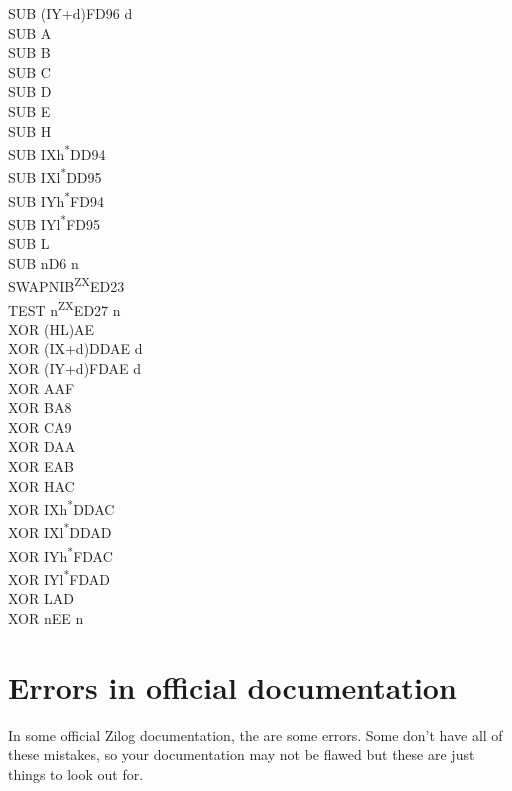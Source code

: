 \documentclass[twoside,openright,a4paper]{book}
\begin{document}
\begin{multicols}{3}
{\begin{tabbing}
	SUB (IY+d)\>FD96 d\\
	SUB A\\
	SUB B\\
	SUB C\\
	SUB D\\
	SUB E\\
	SUB H\\
	SUB IXh\textsuperscript{*}\>DD94\\
	SUB IXl\textsuperscript{*}\>DD95\\
	SUB IYh\textsuperscript{*}\>FD94\\
	SUB IYl\textsuperscript{*}\>FD95\\
	SUB L\\
	SUB n\>D6 n\\
	SWAPNIB\textsuperscript{ZX}\>ED23\\
	TEST n\textsuperscript{ZX}\>ED27 n\\
	XOR (HL)\>AE\\
	XOR (IX+d)\>DDAE d\\
	XOR (IY+d)\>FDAE d\\
	XOR A\>AF\\
	XOR B\>A8\\
	XOR C\>A9\\
	XOR D\>AA\\
	XOR E\>AB\\
	XOR H\>AC\\
	XOR IXh\textsuperscript{*}\>DDAC\\
	XOR IXl\textsuperscript{*}\>DDAD\\
	XOR IYh\textsuperscript{*}\>FDAC\\
	XOR IYl\textsuperscript{*}\>FDAD\\
	XOR L\>AD\\
	XOR n\>EE n

	\end{tabbing}
}
\end{multicols}
\normalsize


\appendix




\chapter{Errors in official documentation}


In some official Zilog documentation, the are some errors. Some don't have all of these mistakes, so your documentation may not be flawed but these are just things to look out for.
\end{document}
